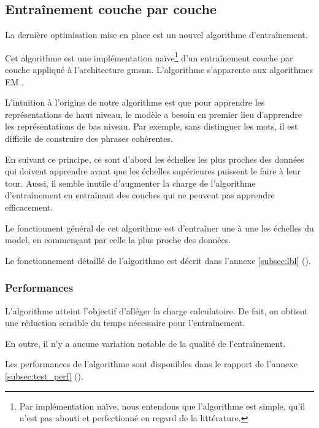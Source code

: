 \subsection{Entraînement couche par couche}\label{subsec:optilbl}
La dernière optimisation mise en place est un nouvel algorithme d'entraînement.

Cet algorithme est une implémentation naïve\footnote{Par \og implémentation naïve\fg{}, nous entendons que l'algorithme est simple, qu'il n'est pas abouti et perfectionné en regard de la littérature.} d'un entraînement couche par couche appliqué à l'architecture \gls{gmsnn}. L'algorithme s'apparente aux algorithmes EM . %

L'intuition à l'origine de notre algorithme est que pour apprendre les représentations de haut niveau, le modèle a besoin en premier lieu d'apprendre les représentations de bas niveau.
Par exemple, sans distinguer les mots, il est difficile de construire des phrases cohérentes.

En suivant ce principe, ce sont d'abord les échelles les plus proches des données qui doivent apprendre avant que les échelles supérieures puissent le faire à leur tour.
Aussi, il semble inutile d'augmenter la charge de l'algorithme d'entraînement en entraînant des couches qui ne peuvent pas apprendre efficacement.

Le fonctionnent général de cet algorithme est d'entraîner une à une les échelles du \gls{model}, en commençant par celle la plus proche des données.

Le fonctionnement détaillé de l'algorithme est décrit dans l'annexe \ref{subsec:lbl} ().

\subsubsection{Performances}

L'algorithme atteint l'objectif d'alléger la charge calculatoire. De fait, on obtient une réduction sensible du temps nécessaire pour l'entraînement.

En outre, il n'y a aucune variation notable de la qualité de l'entraînement.

Les performances de l'algorithme sont disponibles dans le rapport de l'annexe \ref{subsec:test_perf} ().

